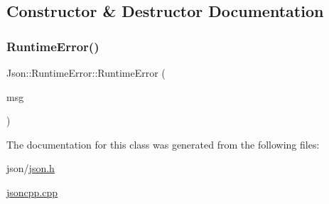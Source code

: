 \subsection{Constructor \& Destructor Documentation}
\mbox{\label{classJson_1_1RuntimeError_a0f6445dc345ce0a703610b6e893fee40_a0f6445dc345ce0a703610b6e893fee40}} 
\subsubsection{\texorpdfstring{Runtime\+Error()}{RuntimeError()}}
{\footnotesize\ttfamily Json\+::\+Runtime\+Error\+::\+Runtime\+Error (\begin{DoxyParamCaption}\item[{\hyperlink{json_8h_a1e723f95759de062585bc4a8fd3fa4be_a1e723f95759de062585bc4a8fd3fa4be}{J\+S\+O\+N\+C\+P\+P\+\_\+\+S\+T\+R\+I\+NG} const \&}]{msg }\end{DoxyParamCaption})}



The documentation for this class was generated from the following files\+:\begin{DoxyCompactItemize}
\item 
json/\hyperlink{json_8h}{json.\+h}\item 
\hyperlink{jsoncpp_8cpp}{jsoncpp.\+cpp}\end{DoxyCompactItemize}
